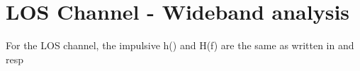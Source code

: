 \section{LOS Channel - Wideband analysis}
For the LOS channel, the impulsive h(\tau) and H(f) are the same as written in  and  resp